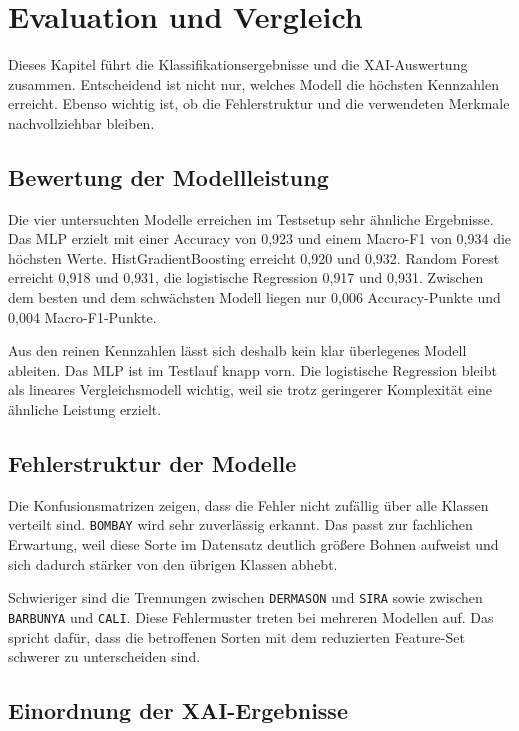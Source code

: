 \chapter{Evaluation und Vergleich}\label{chap:Evaluation-und-Vergleich}

Dieses Kapitel führt die Klassifikationsergebnisse und die XAI-Auswertung zusammen. Entscheidend ist nicht nur, welches Modell die höchsten Kennzahlen erreicht. Ebenso wichtig ist, ob die Fehlerstruktur und die verwendeten Merkmale nachvollziehbar bleiben.

\section{Bewertung der Modellleistung}

Die vier untersuchten Modelle erreichen im Testsetup sehr ähnliche Ergebnisse. Das MLP erzielt mit einer Accuracy von 0{,}923 und einem Macro-F1 von 0{,}934 die höchsten Werte. HistGradientBoosting erreicht 0{,}920 und 0{,}932. Random Forest erreicht 0{,}918 und 0{,}931, die logistische Regression 0{,}917 und 0{,}931. Zwischen dem besten und dem schwächsten Modell liegen nur 0{,}006 Accuracy-Punkte und 0{,}004 Macro-F1-Punkte.

Aus den reinen Kennzahlen lässt sich deshalb kein klar überlegenes Modell ableiten. Das MLP ist im Testlauf knapp vorn. Die logistische Regression bleibt als lineares Vergleichsmodell wichtig, weil sie trotz geringerer Komplexität eine ähnliche Leistung erzielt.

\section{Fehlerstruktur der Modelle}

Die Konfusionsmatrizen zeigen, dass die Fehler nicht zufällig über alle Klassen verteilt sind. \texttt{BOMBAY} wird sehr zuverlässig erkannt. Das passt zur fachlichen Erwartung, weil diese Sorte im Datensatz deutlich größere Bohnen aufweist und sich dadurch stärker von den übrigen Klassen abhebt.

Schwieriger sind die Trennungen zwischen \texttt{DERMASON} und \texttt{SIRA} sowie zwischen \texttt{BARBUNYA} und \texttt{CALI}. Diese Fehlermuster treten bei mehreren Modellen auf. Das spricht dafür, dass die betroffenen Sorten mit dem reduzierten Feature-Set schwerer zu unterscheiden sind.

\section{Einordnung der XAI-Ergebnisse}

